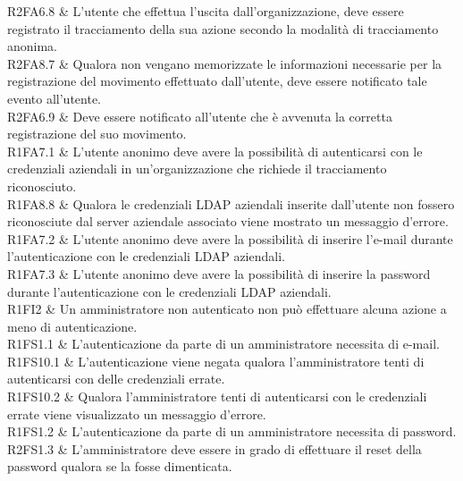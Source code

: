 R2FA6.8 & L’utente che effettua l’uscita dall’organizzazione, deve essere registrato il tracciamento della sua azione secondo la modalità di tracciamento anonima. \\

R2FA8.7 & Qualora non vengano memorizzate le informazioni necessarie per la registrazione del movimento effettuato dall’utente, deve essere notificato tale evento all’utente. \\

R2FA6.9 & Deve essere notificato all’utente che è avvenuta la corretta registrazione del suo movimento. \\


R1FA7.1 & L'utente anonimo deve avere la possibilità di autenticarsi con le credenziali aziendali in un'organizzazione che richiede il tracciamento riconosciuto. \\

R1FA8.8 & Qualora le credenziali LDAP aziendali inserite dall'utente non fossero riconosciute dal server aziendale associato viene mostrato un messaggio d'errore. \\

R1FA7.2 & L'utente anonimo deve avere la possibilità di inserire l'e-mail durante l'autenticazione con le credenziali LDAP aziendali. \\

R1FA7.3 & L'utente anonimo deve avere la possibilità di inserire la password durante l'autenticazione con le credenziali LDAP aziendali. \\

R1FI2 & Un amministratore non autenticato non può effettuare alcuna azione a meno di autenticazione. \\

R1FS1.1 & L’autenticazione da parte di un amministratore necessita di e-mail.\\

R1FS10.1 & L’autenticazione viene negata qualora l'amministratore tenti di autenticarsi con delle credenziali errate. \\

R1FS10.2 & Qualora l'amministratore tenti di autenticarsi con le credenziali errate viene visualizzato un messaggio d’errore. \\

R1FS1.2 & L’autenticazione da parte di un amministratore necessita di password.\\

R2FS1.3 & L'amministratore deve essere in grado di effettuare il reset della password qualora se la fosse dimenticata.\\

